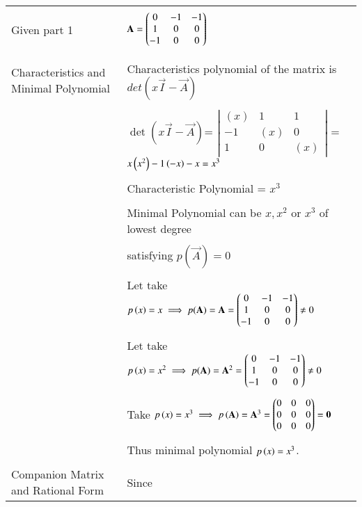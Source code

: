 \begin{longtable}{|l|l|}
\hline
\multirow{3}{*}{Given part 1} & \\
&$\mathbf{A}=\begin{pmatrix}0&-1&-1\\1&0&0\\-1&0&0\end{pmatrix}$\\
&\\
\hline


\multirow{3}{*}{Characteristics and Minimal Polynomial} & \\
&
Characteristics polynomial of the matrix  is $det(x\vec{I}-\vec{A})$\\ 
&\\
& $\det(x\vec{I}-\vec{A})$= $\left|
                \begin{array}{ccc}
                (x) & 1 & 1\\
                -1 & (x) & 0\\
                1 & 0 & (x)
                \end{array} \right|$ =$x\left(x^2\right)-1\left(-x\right)-x=x^3$\\
&\\
& Characteristic Polynomial = $x^3$\\
&\\
& Minimal Polynomial can be $x,x^2$ or $x^3$ of lowest degree\\
&\\
&satisfying $p(\vec{A})=0$    \\
&\\
&Let take $p\left(x\right)=x\implies p(\mathbf{A})=\mathbf{A}=\begin{pmatrix}0&-1&-1\\1&0&0\\-1&0&0\end{pmatrix}\neq0$\\
&\\
&Let take $p\left(x\right)=x^2\implies p(\mathbf{A})=\mathbf{A}^2=\begin{pmatrix}0&-1&-1\\1&0&0\\-1&0&0\end{pmatrix}\neq0$\\
&\\
&Take $p\left(x\right)=x^3\implies p\left(\mathbf{A}\right) =\mathbf{A}^3=\begin{pmatrix}0&0&0\\0&0&0\\0&0&0\end{pmatrix}=\mathbf{0}$\\
&\\
&Thus minimal polynomial $p\left(x\right)=x^3$.\\  
&\\
\hline
\multirow{3}{*}{Companion Matrix and Rational Form} & \\
&Since\\
&\\

\end{longtable}
